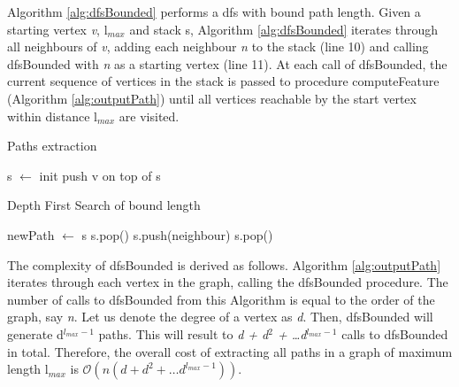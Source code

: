 \documentclass{l4proj}
\begin{document}
Algorithm \ref{alg:dfsBounded} performs a \gls{dfs} with bound path length. Given a starting vertex \emph{v}, l$_{max}$ and stack s, Algorithm \ref{alg:dfsBounded} iterates through all neighbours of \emph{v}, adding each neighbour \emph{n} to the stack (line 10) and calling dfsBounded with \emph{n} as a starting vertex (line 11). At each call of dfsBounded, the current sequence of vertices in the stack is passed to procedure computeFeature (Algorithm \ref{alg:outputPath}) until all vertices reachable by the start vertex within distance l$_{max}$ are visited.

\begin{algorithm}
\centering
\caption{Paths extraction}
\label{alg:generatePath}
\begin{algorithmic}[1]
	\State s $\gets$ init 
	\State push v on top of s
	\State {}
\EndFor
\EndProcedure
\end{algorithmic}
\end{algorithm}

\begin{algorithm}
\centering
\caption{Depth First Search of bound length}
\label{alg:dfsBounded}
\begin{algorithmic}[1]
\State newPath  $\gets$ s  
\State {}
\EndIf
{}
\State s.pop()
\EndIf
{}
\State s.push(neighbour)
\State {} 
\EndIf
\EndFor
{} 
\State s.pop()
\EndIf
\EndProcedure
\end{algorithmic}
\end{algorithm}
The complexity of dfsBounded is derived as follows. Algorithm \ref{alg:outputPath} iterates through each vertex in the graph, calling the dfsBounded procedure. The number of calls to dfsBounded from this Algorithm is equal to the order of the graph, say \emph{n}. Let us denote the degree of a vertex as \emph{d}. Then, dfsBounded will generate d$^{l_{max}-1}$ paths. This will result to \emph{d + d$^{2}$ + \ldots d$^{l_{max}-1}$} calls to dfsBounded in total. Therefore, the overall cost of extracting all paths in a graph of maximum length l$_{max}$ is $\mathcal{O}(n(d + d^{2} + \ldots d^{l_{max}-1}))$.
\end{document}
